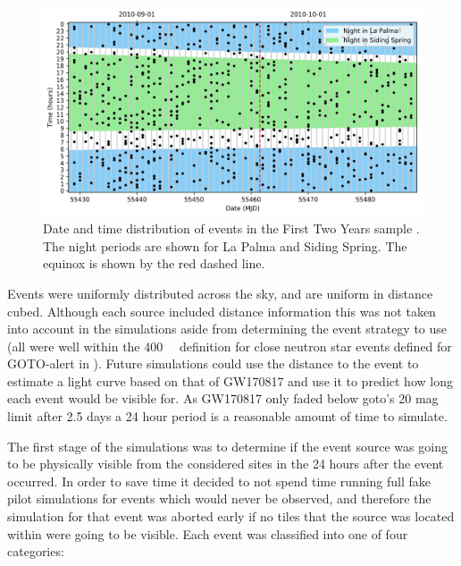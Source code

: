 \begin{colsection}
\begin{colsection}
\begin{figure}[t]
\begin{center}
\includegraphics[width=\linewidth]{images/f2y_times.png}
\end{center}

\caption[Date and time distribution of events in the First Two Years sample]{Date and time distribution of events in the First Two Years sample \citep{First2Years}. The night periods are shown for La Palma and Siding Spring. The equinox is shown by the red dashed line. 
}
\label{fig:f2y_times}
\end{figure}

Events were uniformly distributed across the sky, and are uniform in distance cubed. Although each source included distance information this was not taken into account in the simulations aside from determining the event strategy to use (all were well within the \SI{400}{\mega\parsec} definition for close neutron star events defined for GOTO-alert in ). Future simulations could use the distance to the event to estimate a light curve based on that of GW170817 and use it to predict how long each event would be visible for. As GW170817 only faded below \gls{goto}'s 20 mag limit after 2.5 days a 24 hour period is a reasonable amount of time to simulate.

The first stage of the simulations was to determine if the event source was going to be physically visible from the considered sites in the 24 hours after the event occurred. In order to save time it decided to not spend time running full fake pilot simulations for events which would never be observed, and therefore the simulation for that event was aborted early if no tiles that the source was located within were going to be visible. Each event was classified into one of four categories:


\end{colsection}
\end{colsection}
